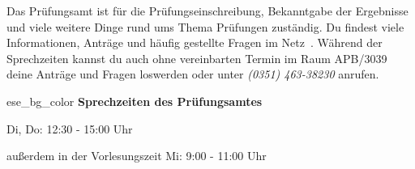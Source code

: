 \label{sec:pruefungsamt}
Das Prüfungsamt ist für die Prüfungseinschreibung, Bekanntgabe der Ergebnisse und viele weitere Dinge rund ums Thema Prüfungen zuständig.
Du findest viele Informationen, Anträge und häufig gestellte Fragen im Netz~.
Während der Sprechzeiten kannst du auch ohne vereinbarten Termin im Raum APB/3039 deine Anträge und Fragen loswerden oder unter \textit{(0351) 463-38230} anrufen.

\begin{awesomeblock}{2pt}{\faCalendar*[regular]}{ese_bg_color}
    \textbf{Sprechzeiten des Prüfungsamtes}

    Di, Do: 12:30 - 15:00 Uhr

    außerdem in der Vorlesungszeit Mi: 9:00 - 11:00 Uhr
\end{awesomeblock}

